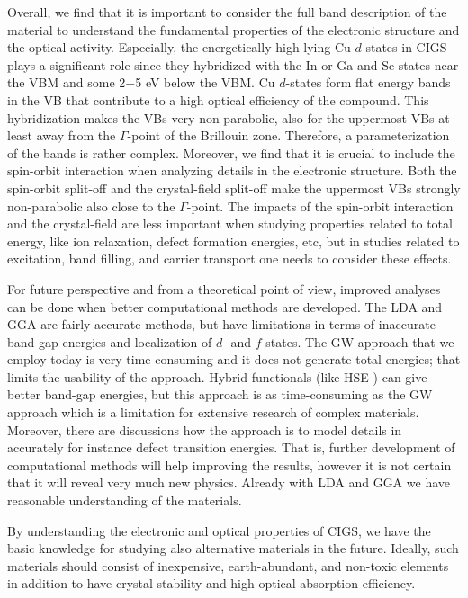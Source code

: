 \documentclass[a4paper, 12pt, titlepage,oneside,drop]{kthesis}
\begin{document}
Overall, we find that it is important to consider the full band description of the material to understand the
fundamental properties of the electronic structure and the optical activity. Especially, the energetically high
lying Cu $d$-states in CIGS plays a significant role since they hybridized with the In or Ga and Se states near the VBM and some 2$-$5 eV below the VBM.  Cu $d$-states form flat energy bands in the VB that contribute to a
high optical efficiency of the compound. This hybridization makes the VBs very non-parabolic, also for the uppermost VBs at least away from the $\Gamma$-point of the Brillouin zone. Therefore, a parameterization of the bands is
rather complex. Moreover, we find that it is crucial to include the spin-orbit interaction when analyzing details in the electronic structure. Both the spin-orbit split-off and the crystal-field split-off make the uppermost VBs
strongly non-parabolic also close to the $\Gamma$-point. The impacts of the spin-orbit interaction and the crystal-field are less important when studying properties related to total energy, like ion relaxation, defect formation 
energies, etc, but in studies related to excitation, band filling, and carrier transport one needs to consider these effects.        


\noindent 
For future perspective and from a theoretical point of view, improved analyses can be done when better computational methods are developed. The LDA and GGA are fairly accurate methods, but have limitations 
in terms of inaccurate band-gap energies and localization of $d$- and $f$-states. The GW approach that we employ today is very time-consuming and it does not generate total energies; that limits the usability of the approach. 
Hybrid functionals (like HSE \cite{paier2006screened}) can give better band-gap energies, but this approach is as time-consuming as the GW approach which is a limitation for extensive research of complex materials. Moreover, there are discussions how
the approach is to model details in accurately for instance defect transition energies. 
That is, further development of computational methods will help improving the results, however it is not certain that
it will reveal very much new physics. Already with LDA and GGA we have reasonable understanding of the materials.    

By understanding the electronic and optical properties of CIGS, we have the basic knowledge for studying also 
alternative materials in the future. Ideally, such materials should consist of inexpensive, earth-abundant, 
and non-toxic elements in addition to have crystal stability and high optical absorption efficiency.  
\end{document}
